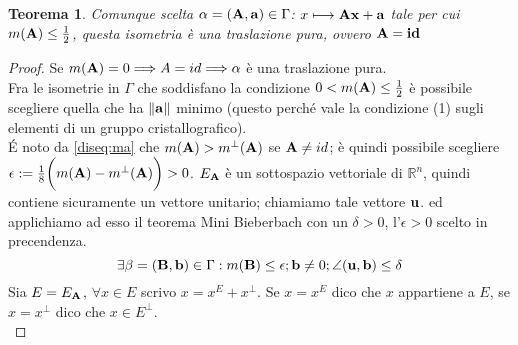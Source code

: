 \documentclass[a4paper,11pt,openright,twoside	]{book}
\newtheorem{theorem}{Teorema}[section]
\begin{document}
\begin{theorem}
\label{lemma:bib}
 Comunque scelta $\alpha = (\vb{A, a}) \in \Gamma$:  $x \longmapsto \vb{Ax +a} $  tale per cui $m(\vb{A}) \leq \frac{1}{2} $, questa isometria è una traslazione pura, ovvero $\vb{A} = \vb{id}$
\end{theorem}

\begin{proof}
Se $m(\vb{A}) = 0 \Longrightarrow A = id \Longrightarrow \alpha$ è una traslazione pura. \\
Fra le isometrie in $\Gamma$ che soddisfano la condizione  $ 0 < m(\vb{A}) \leq \frac{1}{2}$ è possibile scegliere quella che ha $\norm{\vb{a}}$ minimo (questo perché vale la condizione (1) sugli elementi di un gruppo cristallografico). \\
\'E noto da \ref{diseq:ma} che $m(\vb{A}) > m^{\perp}(\vb{A})$ se  $\vb{A} \neq id$; è quindi possibile scegliere  $\epsilon := \frac{1}{8} \bigg( m(\vb{A}) - m^{\perp}(\vb{A}) \bigg) >0$.
$E_{\vb{A}}$ è un sottospazio vettoriale di $\mathbb{R}^n$, quindi contiene sicuramente un vettore unitario; chiamiamo tale vettore $\vb{u}$.  ed applichiamo ad esso il teorema Mini Bieberbach con un $\delta >0$, l'$\epsilon >0 $ scelto in precendenza. \\
\[ \exists \beta = (\vb{B, b}) \in \Gamma : m(\vb{B}) \leq \epsilon ; \vb{b} \neq 0 ; \angle(\vb{u, b})  \leq \delta \]
Sia $E = E_{\vb{A}}$, $\forall x \in E$ scrivo $x = x^{E} + x^{\perp}$. Se $x = x^{E}$ dico che $x$ appartiene a $E$, se $x = x^{\perp}$ dico che $x \in E^{\perp}$.  \\



\end{proof}
\end{document}
